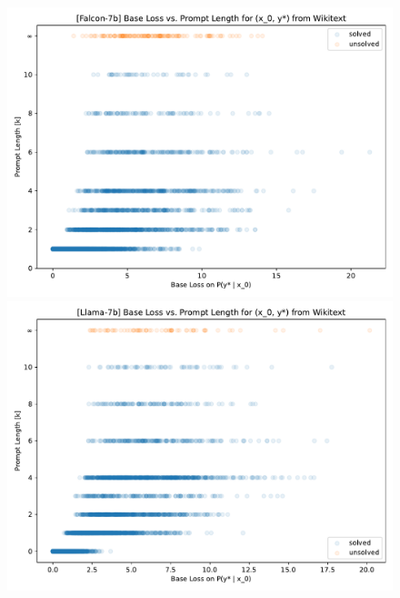 \documentclass{article} %
\begin{document}
\begin{figure}[ht]
    \centering
    \begin{minipage}[b]{0.48\textwidth}
        \includegraphics[width=\textwidth]{figs/og_falcon7b_base_loss_vs_prompt_length.pdf}
    \end{minipage}
    \hfill
    \begin{minipage}[b]{0.48\textwidth}
        \includegraphics[width=\textwidth]{figs/og_llama7b_base_loss_vs_prompt_length.pdf}
    \end{minipage}
    
    \vspace{1em} %
    

\end{figure}
\end{document}
